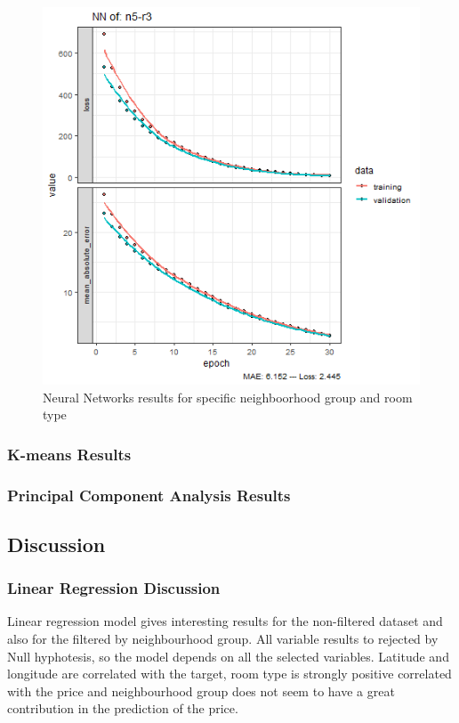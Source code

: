 \documentclass{FR16}
\begin{document}
\begin{figure}[!htb]
\begin{minipage}{0.33\textwidth}
   \end{minipage}
   \begin{minipage}{0.33\textwidth}
     \centering
     \includegraphics[width=1\linewidth]{figures/NN-n5-r3.png} 
   \end{minipage}\hfill
           \caption{Neural Networks results for specific neighboorhood group and room type}\label{fig:21}

\end{figure}
\newpage
\subsubsection{K-means Results}

\newpage

\subsubsection{Principal Component Analysis Results}

\newpage
\subsection{Discussion}

\subsubsection{Linear Regression Discussion}
Linear regression model gives interesting results for the non-filtered dataset and also for the filtered by neighbourhood group.
All variable results to rejected by Null hyphotesis, so the model depends on all the selected variables.
Latitude and longitude are correlated with the target, room type is strongly positive correlated with the price and neighbourhood group does not seem to have
a great contribution in the prediction of the price.
\\
\end{document}
